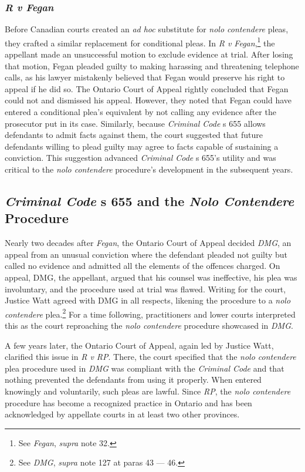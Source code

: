 \subsubsection{\textit{R v Fegan}}

Before Canadian courts created an \textit{ad hoc} substitute for \textit{nolo contendere} pleas, they crafted a similar replacement for conditional pleas. In \textit{R v Fegan},\footnote{See \textit{Fegan}, \textit{supra} note 32.} the appellant made an unsuccessful motion to exclude evidence at trial. After losing that motion, Fegan pleaded guilty to making harassing and threatening telephone calls, as his lawyer mistakenly believed that Fegan would preserve his right to appeal if he did so. The Ontario Court of Appeal rightly concluded that Fegan could not and dismissed his appeal. However, they noted that Fegan could have entered a conditional plea's equivalent by not calling any evidence after the prosecutor put in its case. Similarly, because \textit{Criminal Code} s 655 allows defendants to admit facts against them, the court suggested that future defendants willing to plead guilty may agree to facts capable of sustaining a conviction. This suggestion advanced \textit{Criminal Code} s 655's utility and was critical to the \textit{nolo contendere} procedure's development in the subsequent years.

\subsection{\textit{Criminal Code} s 655 and the \textit{Nolo Contendere} Procedure}

Nearly two decades after \textit{Fegan}, the Ontario Court of Appeal decided \textit{DMG}, an appeal from an unusual conviction where the defendant pleaded not guilty but called no evidence and admitted all the elements of the offences charged. On appeal, DMG, the appellant, argued that his counsel was ineffective, his plea was involuntary, and the procedure used at trial was flawed. Writing for the court, Justice Watt agreed with DMG in all respects, likening the procedure to a \textit{nolo contendere} plea.\footnote{See \textit{DMG}, \textit{supra} note 127 at paras 43 — 46.} For a time following, practitioners and lower courts interpreted this as the court reproaching the \textit{nolo contendere} procedure showcased in \textit{DMG}.

A few years later, the Ontario Court of Appeal, again led by Justice Watt, clarified this issue in \textit{R v RP}. There, the court specified that the \textit{nolo contendere} plea procedure used in \textit{DMG} was compliant with the \textit{Criminal Code} and that nothing prevented the defendants from using it properly. When entered knowingly and voluntarily, such pleas are lawful. Since \textit{RP}, the \textit{nolo contendere} procedure has become a recognized practice in Ontario and has been acknowledged by appellate courts in at least two other provinces.

